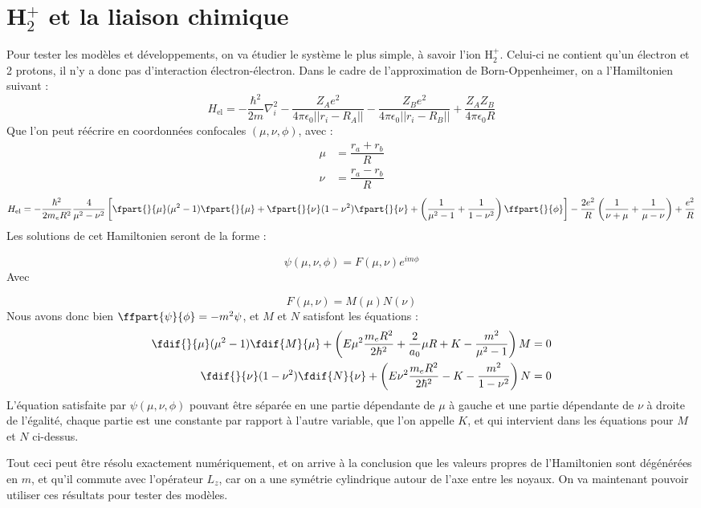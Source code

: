 \section{\textnormal{H}$_2^+$ et la liaison chimique}


Pour tester les modèles et développements, on va étudier le système le plus simple, à savoir l'ion H$_2^+$. Celui-ci ne contient qu'un électron et 2 protons, il n'y a donc pas d'interaction électron-électron. Dans le cadre de l'approximation de Born-Oppenheimer, on a l'Hamiltonien suivant :
\[
    H_\text{el} = -\dfrac{\hbar^2}{2m}\nabla^2_i-\dfrac{Z_Ae^2}{4\pi \epsilon_0||r_i - R_A||}-\dfrac{Z_Be^2}{4\pi \epsilon_0||r_i - R_B||} +\dfrac{Z_AZ_B}{4\pi\epsilon_0R}
\]
Que l'on peut réécrire en coordonnées confocales $(\mu, \nu, \phi)$, avec :
\begin{align*}
    \mu &= \dfrac{r_a + r_b}{R}\\
    \nu &= \dfrac{r_a-r_b}{R}
\end{align*}
\[
    H_\text{el} = -\dfrac{\hbar^2}{2m_eR^2}\dfrac{4}{\mu^2-\nu^2}\left[\fpart{}{\mu}(\mu^2-1)\fpart{}{\mu}+\fpart{}{\nu}(1-\nu^2)\fpart{}{\nu}+\left(\dfrac{1}{\mu^2-1}+\dfrac{1}{1-\nu^2}\right)\ffpart{}{\phi}\right] - \dfrac{2e^2}{R}\left(\dfrac{1}{\nu + \mu}+\dfrac{1}{\mu-\nu}\right) + \dfrac{e^2}{R}
\]
Les solutions de cet Hamiltonien seront de la forme :

\[ \psi(\mu,\nu,\phi) = F(\mu,\nu)e^{im\phi} \]
Avec

\[ F(\mu,\nu) = M(\mu)N(\nu) \]
Nous avons donc bien $\ffpart{\psi}{\phi} = -m^2\psi$, et $M$ et $N$ satisfont les équations :
\begin{align*}
    \fdif{}{\mu}(\mu^2-1)\fdif{M}{\mu} + \left(E\mu^2\dfrac{m_eR^2}{2\hbar^2}+\dfrac{2}{a_0}\mu R+K-\dfrac{m^2}{\mu^2-1}\right)M &= 0\\
    \fdif{}{\nu}(1-\nu^2)\fdif{N}{\nu} + \left(E\nu^2\dfrac{m_eR^2}{2\hbar^2}-K-\dfrac{m^2}{1-\nu^2}\right)N &= 0
\end{align*}
L'équation satisfaite par $\psi(\mu,\nu,\phi)$ pouvant être séparée en une partie dépendante de $\mu$ à gauche et une partie dépendante de $\nu$ à droite de l'égalité, chaque partie est une constante par rapport à l'autre variable, que l'on appelle $K$, et qui intervient dans les équations pour $M$ et $N$ ci-dessus.

Tout ceci peut être résolu exactement numériquement, et on arrive à la conclusion que les valeurs propres de l'Hamiltonien sont dégénérées en $m$, et qu'il commute avec l'opérateur $L_z$, car on a une symétrie cylindrique autour de l'axe entre les noyaux. On va maintenant pouvoir utiliser ces résultats pour tester des modèles.


